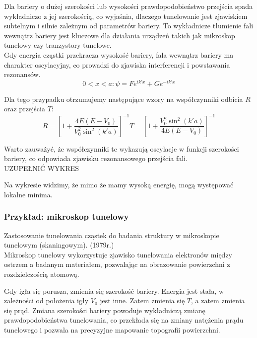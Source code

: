 Dla bariery o dużej szerokości lub wysokości prawdopodobieństwo przejścia spada wykładniczo z jej szerokością,
co wyjaśnia, dlaczego tunelowanie jest zjawiskiem subtelnym i silnie zależnym od parametrów bariery.
To wykładnicze tłumienie fali wewnątrz bariery jest kluczowe dla działania urządzeń takich jak mikroskop tunelowy
czy tranzystory tunelowe.\\


Gdy energia cząstki przekracza wysokość bariery, fala wewnątrz bariery ma charakter oscylacyjny,
co prowadzi do zjawiska interferencji i powstawania rezonansów.
\begin{equation*}
    0 < x < a: \psi = F e^{ik'x} + G e^{-ik'x}
\end{equation*}

Dla tego przypadku otrzumujemy następujące wzory na współczynniki odbicia $R$ oraz przejścia $T$:
\begin{equation*}
    R = \left[ 1 + \frac{4 E (E - V_0)}{V_0^2 \sin^2(k'a)} \right] ^{-1}
    T = \left[ 1 + \frac{V_0^2 \sin^2(k'a)}{4 E (E - V_0)} \right] ^{-1}
\end{equation*}

Warto zauważyć, że współczynniki te wykazują oscylacje w funkcji szerokości bariery, co odpowiada zjawisku rezonansowego przejścia fali. \\

{{ UZUPEŁNIĆ WYKRES }}

Na wykresie widzimy, że mimo że mamy wysoką energię, mogą występować lokalne minima. \\


\subsubsection{Przykład: mikroskop tunelowy}
Zastosowanie tunelowania cząstek do badania struktury w mikroskopie tunelowym (skaningowym). (1979r.) \\

Mikroskop tunelowy wykorzystuje zjawisko tunelowania elektronów między ostrzem a badanym materiałem,
pozwalając na obrazowanie powierzchni z rozdzielczością atomową.

Gdy igła się porusza, zmienia się szerokość bariery. Energia jest stała, w zależności od położenia igły $V_0$ jest inne. Zatem zmienia się $T$,
a zatem zmienia się prąd. Zmiana szerokości bariery powoduje wykładniczą zmianę prawdopodobieństwa tunelowania, co przekłada się na zmiany
natężenia prądu tunelowego i pozwala na precyzyjne mapowanie topografii powierzchni.\\

